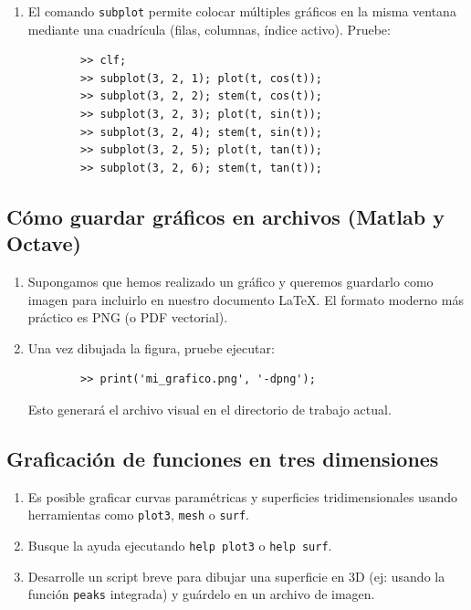 \begin{enumerate}
	\item El comando \texttt{subplot} permite colocar múltiples gráficos en la misma ventana mediante una cuadrícula (filas, columnas, índice activo). Pruebe:
	\begin{verbatim}
		>> clf;
		>> subplot(3, 2, 1); plot(t, cos(t));
		>> subplot(3, 2, 2); stem(t, cos(t));
		>> subplot(3, 2, 3); plot(t, sin(t));
		>> subplot(3, 2, 4); stem(t, sin(t));
		>> subplot(3, 2, 5); plot(t, tan(t));
		>> subplot(3, 2, 6); stem(t, tan(t));
	\end{verbatim}
	
\end{enumerate}

\subsection{Cómo guardar gráficos en archivos (Matlab y Octave)}

\begin{enumerate}
	
	\item Supongamos que hemos realizado un gráfico y queremos guardarlo como imagen para incluirlo en nuestro documento LaTeX. El formato moderno más práctico es PNG (o PDF vectorial).
	
	\item Una vez dibujada la figura, pruebe ejecutar:
	\begin{verbatim}
		>> print('mi_grafico.png', '-dpng');
	\end{verbatim}
	Esto generará el archivo visual en el directorio de trabajo actual. 
\end{enumerate}

\subsection{Graficación de funciones en tres dimensiones}

\begin{enumerate}
	\item Es posible graficar curvas paramétricas y superficies tridimensionales usando herramientas como \texttt{plot3}, \texttt{mesh} o \texttt{surf}.
	
	\item Busque la ayuda ejecutando \texttt{help plot3} o \texttt{help surf}.
	
	\item Desarrolle un script breve para dibujar una superficie en 3D (ej: usando la función \texttt{peaks} integrada) y guárdelo en un archivo de imagen.
\end{enumerate}


